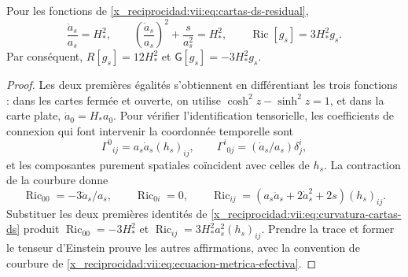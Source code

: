\begin{lemma}
\label{x_reciprocidad:vii:lem:curvatura-cartas-ds}
Pour les fonctions de \eqref{x_reciprocidad:vii:eq:cartas-ds-residual},
\begin{equation}
 \frac{\ddot a_s}{a_s}=H_*^2,\qquad
 \left(\frac{\dot a_s}{a_s}\right)^2+\frac{s}{a_s^2}=H_*^2,
 \qquad
 \operatorname{Ric}[g_s]=3H_*^2g_s.
 \label{x_reciprocidad:vii:eq:curvatura-cartas-ds}
\end{equation}
Par conséquent, \(R[g_s]=12H_*^2\) et
\(\mathsf G[g_s]=-3H_*^2g_s\).
\end{lemma}
\begin{proof}
Les deux premières égalités s'obtiennent en différentiant les trois fonctions :
dans les cartes fermée et ouverte, on utilise
\(\cosh^2z-\sinh^2z=1\), et dans la carte plate,
\(\dot a_0=H_*a_0\). Pour vérifier l'identification tensorielle,
les coefficients de connexion qui font intervenir la coordonnée temporelle sont
\[
 \Gamma^0{}_{ij}=a_s\dot a_s(h_s)_{ij},\qquad
 \Gamma^i{}_{0j}=(\dot a_s/a_s)\delta^i_j,
\]
et les composantes purement spatiales coïncident avec celles de \(h_s\). La contraction de la courbure donne
\[
 \operatorname{Ric}_{00}=-3\ddot a_s/a_s,\qquad
 \operatorname{Ric}_{0i}=0,\qquad
 \operatorname{Ric}_{ij}
  =(a_s\ddot a_s+2\dot a_s^2+2s)(h_s)_{ij}.
\]
Substituer les deux premières identités de
\eqref{x_reciprocidad:vii:eq:curvatura-cartas-ds} produit
\(\operatorname{Ric}_{00}=-3H_*^2\) et
\(\operatorname{Ric}_{ij}=3H_*^2a_s^2(h_s)_{ij}\).
Prendre la trace et former le tenseur d'Einstein prouve les autres
affirmations, avec la convention de courbure de
\eqref{x_reciprocidad:vii:eq:ecuacion-metrica-efectiva}.
\end{proof}

